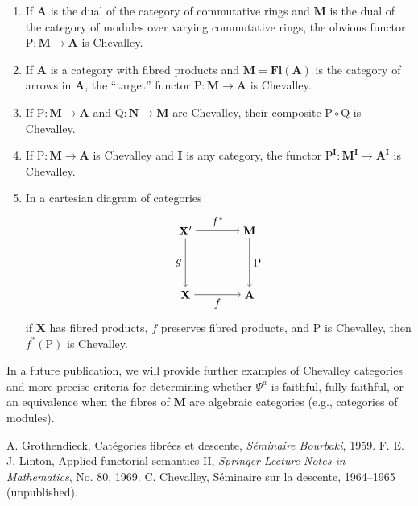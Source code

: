 \documentclass{article}
\theoremstyle{plain}
\theoremstyle{remark}
\begin{document}
\begin{enumerate}
    \item If $\mathbf{A}$ is the dual of the category of commutative rings and $\mathbf{M}$ is the dual of the category of modules over varying commutative rings, the obvious functor $\mathrm{P} : \mathbf{M} \to \mathbf{A}$ is Chevalley.
    \item If $\mathbf{A}$ is a category with fibred products and $\mathbf{M} = \mathbf{Fl}(\mathbf{A})$ is the category of arrows in $\mathbf{A}$, the ``target'' functor $\mathrm{P} : \mathbf{M} \to \mathbf{A}$ is Chevalley.
    \item If $\mathrm{P} : \mathbf{M} \to \mathbf{A}$ and $\mathrm{Q} : \mathbf{N} \to \mathbf{M}$ are Chevalley, their composite $\mathrm{P} \circ \mathrm{Q}$ is Chevalley.
    \item If $\mathrm{P} : \mathbf{M} \to \mathbf{A}$ is Chevalley and $\mathbf{I}$ is any category, the functor $\mathrm{P}^{\mathbf{I}} : \mathbf{M}^{\mathbf{I}} \to \mathbf{A}^{\mathbf{I}}$ is Chevalley.
    \item In a cartesian diagram of categories
    \[
    \begin{tikzpicture}
        \node (X') at (0,2) {$\mathbf{X}'$};
        \node (M) at (2,2) {$\mathbf{M}$};
        \node (X) at (0,0) {$\mathbf{X}$};
        \node (A) at (2,0) {$\mathbf{A}$};
        \draw[->] (X') to node[above] {$f^*$} (M);
        \draw[->] (X') to node[left] {$g$} (X);
        \draw[->] (M) to node[right] {$\mathrm{P}$} (A);
        \draw[->] (X) to node[below] {$f$} (A);
    \end{tikzpicture}
    \]
    if $\mathbf{X}$ has fibred products, $f$ preserves fibred products, and $\mathrm{P}$ is Chevalley, then $f^*(\mathrm{P})$ is Chevalley.
\end{enumerate}

In a future publication, we will provide further examples of Chevalley categories and more precise criteria for determining whether $\Psi^a$ is faithful, fully faithful, or an equivalence when the fibres of $\mathbf{M}$ are algebraic categories (e.g., categories of modules).

\begin{thebibliography}{9}
 A. Grothendieck, Cat\'egories fibr\'ees et descente, \emph{S\'eminaire Bourbaki}, 1959.
 F. E. J. Linton, Applied functorial semantics II, \emph{Springer Lecture Notes in Mathematics}, No. 80, 1969.
 C. Chevalley, S\'eminaire sur la descente, 1964--1965 (unpublished).
\end{thebibliography}
\end{document}
